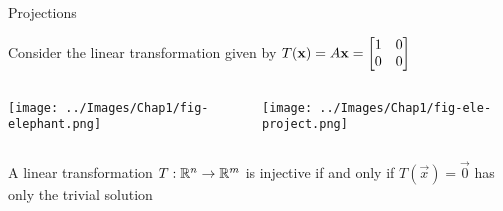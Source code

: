 \documentclass[xcoler=dvipsnames, aspectratio=169]{beamer}
\begin{document}
\begin{frame}{Projections}

Consider the linear transformation given by $\displaystyle T(\mathbf{x}) = A \mathbf{x} = \begin{bmatrix} 1 & 0 \\ 0 & 0 \end{bmatrix}$ 


\begin{columns}

\column{0.5\tw}

\begin{center}
\texttt{[image: ../Images/Chap1/fig-elephant.png]}
\end{center}

\column{0.5\tw}

\begin{center}
\texttt{[image: ../Images/Chap1/fig-ele-project.png]}
\end{center}

\end{columns}

\end{frame}
\begin{frame}
    \begin{theorem}
        A linear transformation $T:\mathbb{R}^n\rightarrow\mathbb{R}^m$ is injective if and only if $T(\vec{x})=\vec{0}$
        has only the trivial solution
    \end{theorem}
    \iftoggle{showSolutions}{
        \begin{proof}
            $\implies$ direction. Assume that $T$ is injective and there is some $\vec{v}\neq\vec{0}$
            such that $T(\vec{v}) = \vec{0}$. Well, this contradicts the fact that $T$ is injective
            because $T(\vec{0}) = T(\vec{v}) = \vec{0}$.\\
            $\impliedby$ direction. Assume $T$ is not injective. This means there are some
            $\vec{u}$ and $\vec{v}$ such that $\vec{u}\neq\vec{v}$, and $T(\vec{u})=T(\vec{v})=
            \vec{b}\in\R^m$ and $T(\vec{x}) = \vec{0}$ has only the trivial solution. See that
            \[
                T(\vec{u}-\vec{v}) = T(\vec{u}) - T(\vec{v}) = \vec{b}-\vec{b} = \vec{0}
            \]
            Since $\vec{u}\neq\vec{v}$, we know that $\vec{u}-\vec{v}\neq\vec{0}$. This contradicts
            the fact that $T(\vec{x})=\vec{0}$ has only the trivial solution.
        \end{proof}
    }{
        \vspace{150pt}
    }
\end{frame}
\end{document}
